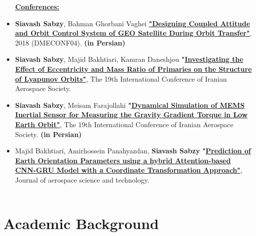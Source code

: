 \documentclass[11pt,a4paper, sans]{moderncv}
\begin{document}
\begin{itemize}
 \textbf{\underline{\href{https://scholar.google.com/citations?user=pz4gpScAAAAJ&hl=en}{Conferences:}}}
	\item \textbf{Siavash Sabzy}, Bahman Ghorbani Vaghei
 \textbf{\href{https://civilica.com/doc/881918/}{"Designing Coupled Attitude and Orbit Control System of GEO Satellite During Orbit Transfer"}}, 2018 (DMECONF04). \textbf{(in Persian)}
 \vspace{5pt}
 \item \textbf{Siavash Sabzy}, Majid Bakhtiari, Kamran Daneshjou
 \textbf{"\href{https://civilica.com/doc/1362193}{Investigating the Effect of Eccentricity and Mass Ratio of Primaries on the Structure of Lyapunov Orbits"}}, The 19th International Conference of Iranian Aerospace Society. 
 \vspace{5pt}
 \item \textbf{Siavash Sabzy}, Meisam Farajollahi
 \textbf{"\href{https://civilica.com/doc/1362348/}{Dynamical Simulation of MEMS Inertial Sensor for Measuring the Gravity Gradient Torque in Low Earth Orbit"}}, The 19th International Conference of Iranian Aerospace Society. \textbf{(in Persian)} 
 \vspace{5pt}
 \item Majid Bakhtiari, Amirhossein Panahyazdan, \textbf{Siavash Sabzy}
 \textbf{"\href{https://doi.org/10.22034/jast.2024.442700.1174}{Prediction of Earth Orientation Parameters using a hybrid Attention-based CNN-GRU Model with a Coordinate Transformation Approach"}}, Journal of aerospace science and technology. 
 \\ \\
\end{itemize}



\section{Academic Background}
%
\end{document}
